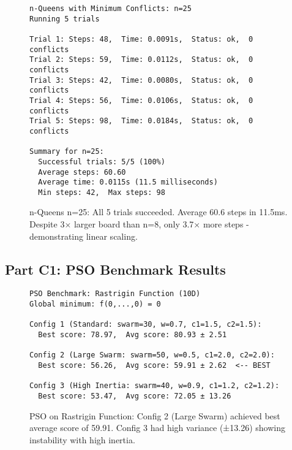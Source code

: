 \documentclass[letterpaper]{article}
\begin{document}
\begin{figure}[h]
\begin{small}
\begin{verbatim}
n-Queens with Minimum Conflicts: n=25
Running 5 trials

Trial 1: Steps: 48,  Time: 0.0091s,  Status: ok,  0 conflicts
Trial 2: Steps: 59,  Time: 0.0112s,  Status: ok,  0 conflicts
Trial 3: Steps: 42,  Time: 0.0080s,  Status: ok,  0 conflicts
Trial 4: Steps: 56,  Time: 0.0106s,  Status: ok,  0 conflicts
Trial 5: Steps: 98,  Time: 0.0184s,  Status: ok,  0 conflicts

Summary for n=25:
  Successful trials: 5/5 (100%)
  Average steps: 60.60
  Average time: 0.0115s (11.5 milliseconds)
  Min steps: 42,  Max steps: 98
\end{verbatim}
\end{small}
\caption{n-Queens n=25: All 5 trials succeeded. Average 60.6 steps in 11.5ms. Despite 3× larger board than n=8, only 3.7× more steps - demonstrating linear scaling.}
\label{fig:nqueens-25}
\end{figure}

\subsection{Part C1: PSO Benchmark Results}

\begin{figure}[h]
\begin{small}
\begin{verbatim}
PSO Benchmark: Rastrigin Function (10D)
Global minimum: f(0,...,0) = 0

Config 1 (Standard: swarm=30, w=0.7, c1=1.5, c2=1.5):
  Best score: 78.97,  Avg score: 80.93 ± 2.51

Config 2 (Large Swarm: swarm=50, w=0.5, c1=2.0, c2=2.0):
  Best score: 56.26,  Avg score: 59.91 ± 2.62  <-- BEST

Config 3 (High Inertia: swarm=40, w=0.9, c1=1.2, c2=1.2):
  Best score: 53.47,  Avg score: 72.05 ± 13.26
\end{verbatim}
\end{small}
\caption{PSO on Rastrigin Function: Config 2 (Large Swarm) achieved best average score of 59.91. Config 3 had high variance (±13.26) showing instability with high inertia.}
\label{fig:pso-rastrigin}
\end{figure}
\end{document}
